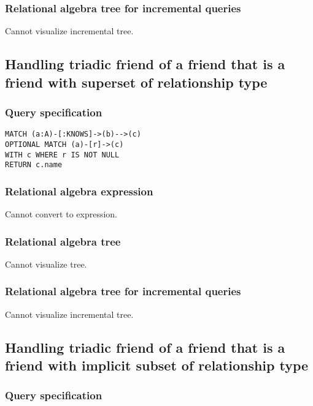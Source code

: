 \subsubsection*{Relational algebra tree for incremental queries}

Cannot visualize incremental tree.

\subsection{Handling triadic friend of a friend that is a friend with superset of relationship type}

\subsubsection*{Query specification}

\begin{lstlisting}
MATCH (a:A)-[:KNOWS]->(b)-->(c)
OPTIONAL MATCH (a)-[r]->(c)
WITH c WHERE r IS NOT NULL
RETURN c.name
\end{lstlisting}

\subsubsection*{Relational algebra expression}

Cannot convert to expression.

\subsubsection*{Relational algebra tree}

Cannot visualize tree.

\subsubsection*{Relational algebra tree for incremental queries}

Cannot visualize incremental tree.

\subsection{Handling triadic friend of a friend that is a friend with implicit subset of relationship type}

\subsubsection*{Query specification}

